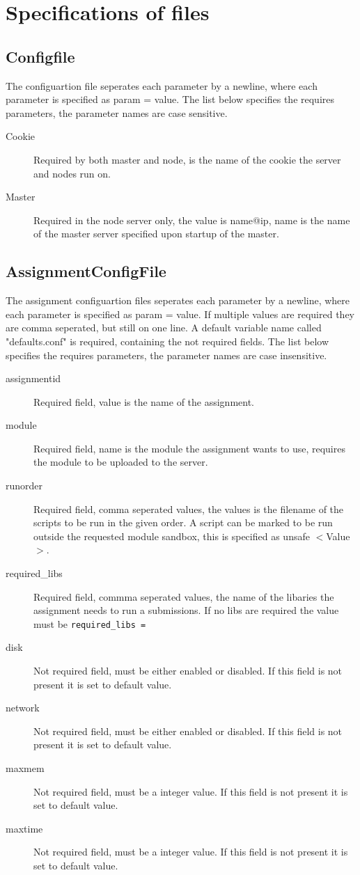 \chapter{Specifications of files}
\section{Configfile}
\label{sec:config}
The configuartion file seperates each parameter by a newline, where each parameter is specified as param = value.
The list below specifies the requires parameters, the parameter names are case sensitive.
\begin{description}
    \item[Cookie] Required by both master and node, is the name of the cookie the server and nodes run on.
    \item[Master] Required in the node server only, the value is name@ip, name is the name of the master server specified upon startup of the master.
\end{description}
\section{AssignmentConfigFile}
\label{sec:assignment}
The assignment configuartion files seperates each parameter by a newline, where each parameter is specified as param = value. If multiple values are required they are comma seperated, but still on one line. A default variable name called "defaults.conf" is required, containing the not required fields.
The list below specifies the requires parameters, the parameter names are case insensitive.
\begin{description}
    \item [assignmentid] Required field, value is the name of the assignment.
    \item [module] Required field, name is the module the assignment wants to use, requires the module to be uploaded to the server.
    \item [runorder] Required field, comma seperated values, the values is the filename of the scripts to be run in the given order. A script can be marked to be run outside the requested module sandbox, this is specified as unsafe $<$Value$>$.
    \item [required\_libs] Required field, commma seperated values, the name of the libaries the assignment needs to run a submissions. If no libs are required the value must be \texttt{required\_libs =}
    \item [disk] Not required field, must be either enabled or disabled. If this field is not present it is set to default value.
    \item [network] Not required field, must be either enabled or disabled. If this field is not present it is set to default value.
    \item [maxmem] Not required field, must be a integer value. If this field is not present it is set to default value.
    \item [maxtime] Not required field, must be a integer value. If this field is not present it is set to default value.
\end{description}
